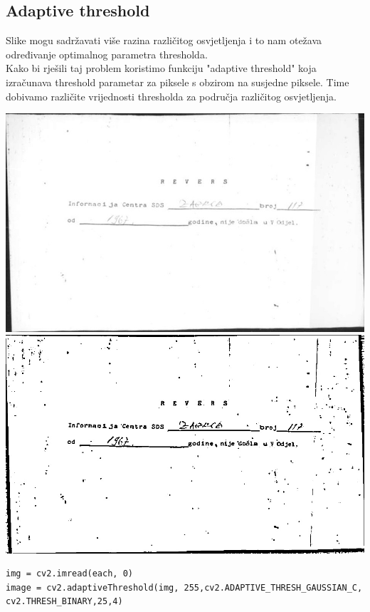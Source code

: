 \documentclass{article}
\begin{document}
\subsection{Adaptive threshold}
Slike mogu sadržavati više razina različitog osvjetljenja i to
nam otežava određivanje optimalnog parametra thresholda. \\ Kako bi rješili taj problem koristimo funkciju "adaptive threshold" koja izračunava threshold parametar za piksele s obzirom na susjedne piksele. Time dobivamo različite vrijednosti thresholda za područja različitog osvjetljenja.
\newline
\begin{center}
    \includegraphics[scale=0.2]{Z05353721-cont.jpg}
    \includegraphics[scale=0.2]{Z05353721_adatpive.jpg}
\end{center}

\newline
\begin{lstlisting}
img = cv2.imread(each, 0)
image = cv2.adaptiveThreshold(img, 255,cv2.ADAPTIVE_THRESH_GAUSSIAN_C, cv2.THRESH_BINARY,25,4)
\end{lstlisting}
\end{document}
